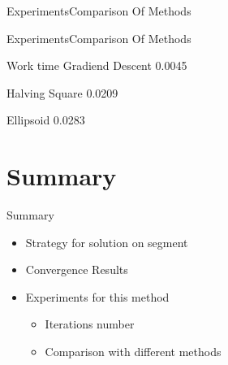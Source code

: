 \documentclass{beamer}
\begin{document}
\begin{frame}{Experiments}{Comparison Of Methods}

\begin{figure}[h!]
\label{fig:image}
\end{figure}

\end{frame}

\begin{frame}{Experiments}{Comparison Of Methods}

\begin{block}{Work time}
Gradiend Descent 0.0045

Halving Square 0.0209

Ellipsoid 0.0283
\end{block}
\end{frame}

\section*{Summary}

\begin{frame}{Summary}
  \begin{itemize}
  \item
    \alert{Strategy for solution on segment}
  \item
    Convergence Results
  \item
    Experiments for this method
        \begin{itemize}
    \item
      Iterations number
    \item
      Comparison with different methods
    \end{itemize}
  \end{itemize}
\end{frame}
\end{document}
